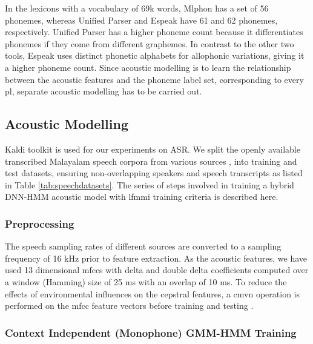 In the lexicons with a vocabulary of 69k words, Mlphon has a set of 56 phonemes, whereas Unified Parser and Espeak have 61 and 62 phonemes, respectively. Unified Parser has a higher phoneme count
because it differentiates phonemes if they come from different graphemes. In
contrast to the other two tools, Espeak uses distinct phonetic alphabets for
allophonic variations, giving it a higher phoneme count. Since acoustic modelling is to learn the relationship between the
acoustic features and the phoneme label set, corresponding to every \gls{pl},
separate acoustic modelling has to be carried out.




\subsection{Acoustic Modelling}

Kaldi toolkit \cite{povey2011kaldi} is used for our experiments on ASR. We
split the openly available transcribed Malayalam speech corpora from various
sources \cite{prahallad2012iiit,baby2016resources, he-etal-2020-open}, into
training and test datasets, ensuring non-overlapping speakers and speech
transcripts as listed in Table \ref{tab:speechdatasets}.
The series of steps involved in training a hybrid DNN-HMM acoustic model with
\gls{lfmmi} training criteria is described here.

\subsubsection{Preprocessing}

The speech sampling rates of different sources are converted to a sampling
frequency of 16 kHz prior to feature extraction. As the acoustic features, we
have used 13 dimensional \gls{mfcc}s with delta and double delta coefficients
computed over a window (Hamming) size of 25 ms with an overlap of 10 ms. To
reduce the effects of environmental influences on the cepstral features, a
\gls{cmvn} operation is performed on the \gls{mfcc} feature vectors before
training and testing \cite{viikki1998cepstral}.

\subsubsection{Context Independent (Monophone) GMM-HMM Training}

